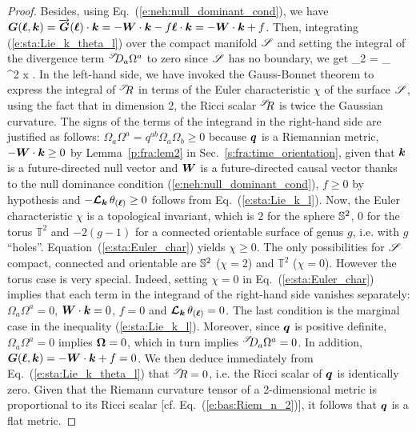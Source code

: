 \begin{proof}
Besides, using Eq.~(\ref{e:neh:null_dominant_cond}), we have
$\bm{G}(\bm{\ell}, \bm{k}) = \overrightarrow{\bm{G}}(\bm{\ell})\cdot\bm{k} = - \bm{W}\cdot\bm{k} - f \bm{\ell}\cdot \bm{k} = - \bm{W}\cdot\bm{k} + f$.
Then, integrating (\ref{e:sta:Lie_k_theta_l}) over the compact manifold $\mathscr{S}$
and setting the integral of the divergence term ${}^{\mathscr{S}}\!\!D_a \Omega^a$ to zero since
$\mathscr{S}$ has no boundary, we get
\be \label{e:sta:Euler_char}
    _{2\pi\chi} = \int_\Sp {}
           \, \D^2 x .
\ee
In the left-hand side, we have invoked the Gauss-Bonnet theorem
to express the integral of ${}^{\mathscr{S}}\!\! R$ in terms
of the Euler characteristic $\chi$ of the
surface $\mathscr{S}$, using the fact that in dimension 2,
the Ricci scalar ${}^{\mathscr{S}}\!\! R$ is twice the
Gaussian curvature.
The signs of the terms of the integrand in the right-hand side
are justified as follows:
$\Omega_a \Omega^a = q^{ab} \Omega_a \Omega_b \geq 0$ because $\bm{q}$ is a Riemannian metric,
$- \bm{W}\cdot\bm{k} \geq 0$ by Lemma~\ref{p:fra:lem2} in Sec.~\ref{s:fra:time_orientation},
given that $\bm{k}$ is a future-directed null vector and $\bm{W}$ is a future-directed
causal vector thanks to the null dominance condition (\ref{e:neh:null_dominant_cond}),
$f\geq 0$ by hypothesis and $- \bm{\mathcal{L}}_{\bm{k}}\, \theta_{(\bm{\ell})} \geq 0$
follows from Eq.~(\ref{e:sta:Lie_k_l}). Now, the Euler characteristic $\chi$ is a topological
invariant, which is $2$ for the sphere $\mathbb{S}^2$, $0$ for the torus $\mathbb{T}^2$
and $-2(g-1)$
for a connected orientable surface of genus $g$, i.e. with $g$ ``holes''.
Equation~(\ref{e:sta:Euler_char}) yields $\chi \geq 0$.
The only possibilities for $\mathscr{S}$ compact, connected and orientable
are $\mathbb{S}^2$ ($\chi = 2$) and $\mathbb{T}^2$ ($\chi = 0$).
However the torus case is very special. Indeed, setting $\chi=0$ in Eq.~(\ref{e:sta:Euler_char})
implies that each term in the integrand of the right-hand side vanishes separately:
$\Omega_a \Omega^a = 0$, $\bm{W}\cdot\bm{k} = 0$, $f=0$ and $\bm{\mathcal{L}}_{\bm{k}}\, \theta_{(\bm{\ell})} = 0$.
The last condition is the marginal case in the inequality (\ref{e:sta:Lie_k_l}). Moreover,
since $\bm{q}$ is positive definite, $\Omega_a \Omega^a = 0$ implies $\bm{\Omega} = 0$,
which in turn implies ${}^{\mathscr{S}}\!\!D_a \Omega^a = 0$. In addition,
$\bm{G}(\bm{\ell}, \bm{k}) = - \bm{W}\cdot\bm{k} + f = 0$. We then deduce immediately from
Eq.~(\ref{e:sta:Lie_k_theta_l}) that ${}^{\mathscr{S}}\!\! R = 0$, i.e.
the Ricci scalar of $\bm{q}$ is identically zero. Given that the Riemann
curvature tensor of a 2-dimensional metric is proportional to its
Ricci scalar [cf. Eq.~(\ref{e:bas:Riem_n_2})], it follows that $\bm{q}$
is a flat metric.
\end{proof}

